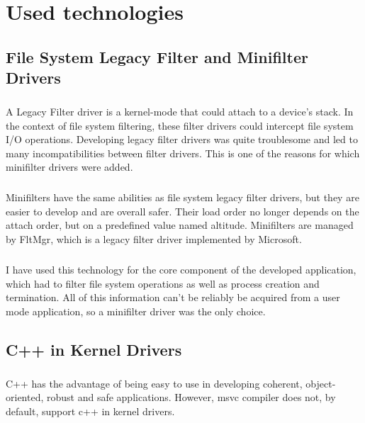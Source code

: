 \chapter{Used technologies}
    \section{File System Legacy Filter and Minifilter Drivers}
        \paragraph{}
        A Legacy Filter driver is a kernel-mode that could attach to a device's stack. In the context of file system filtering, these
        filter drivers could intercept file system I/O operations. Developing legacy filter drivers was quite troublesome and led to 
        many incompatibilities between filter drivers. This is one of the reasons for which minifilter drivers were added.
        
        \paragraph{}
        Minifilters have the same abilities as file system legacy filter drivers, but they are easier to develop and are overall safer. Their
        load order no longer depends on the attach order, but on a predefined value named altitude. Minifilters are managed by FltMgr, which is
        a legacy filter driver implemented by Microsoft.

        \paragraph{}
        I have used this technology for the core component of the developed application, which had to filter file system operations as well
        as process creation and termination. All of this information can't be reliably be acquired from a user mode application, so a minifilter
        driver was the only choice.

    \section{C++ in Kernel Drivers}
        \paragraph{}
        C++ has the advantage of being easy to use in developing coherent, object-oriented, robust and safe applications. However, msvc compiler
        does not, by default, support c++ in kernel drivers.

